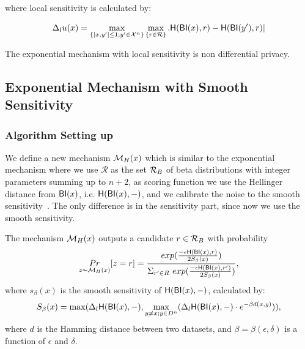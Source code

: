 where local sensitivity is calculated by:

\begin{equation*}
\Delta_{l}u(x) = 
\max_{\{|x,y'| \leq 1;y'\in \mathcal{X}^n\}}\max_{\{r\in \mathcal{R}\}}.
\mathsf{H}(\mathsf{BI}(x), r) - \mathsf{H}(\mathsf{BI}(y'), r)|
\end{equation*}

The exponential mechanism with local sensitivity is non differential privacy\cite{dwork2014algorithmic}.


\subsection{Exponential Mechanism with Smooth Sensitivity}
\label{sec_smoo}

\subsubsection{Algorithm Setting up}
We define a new mechanism $\mathcal{M}_H(x)$
which is similar to the exponential mechanism where we use
$\mathcal{R}$ as the set $\mathcal{R}_{B}$ of beta distributions with integer parameters
summing up to $n+2$, as scoring function we use the Hellinger distance
from $\mathsf{BI}(x)$, i.e. $\mathsf{H}(\mathsf{BI}(x),-)$, and we 
calibrate the noise to the smooth sensitivity~\cite{nissim2007smooth}. The
only difference is in the sensitivity part, since now we use the
smooth sensitivity.

\begin{definition} The mechanism $\mathcal{M}_H(x)$ outputs a candidate $r \in \mathcal{R}_{B}$ with probability
\begin{equation*}
\underset{z \thicksim \mathcal{M}_H(x)}{Pr}[z=r] = \frac
{exp(\frac{-\epsilon\mathsf{H}(\mathsf{BI}(x),r)}{2 S_\beta(x)})}
{\Sigma_{r' \in R}\ exp(\frac{-\epsilon \mathsf{H}(\mathsf{BI}(x),r')}{2 S_\beta(x)})},
\end{equation*}
where $s_\beta(x)$ is the smooth sensitivity of $\mathsf{H}(\mathsf{BI}(x),-)$, calculated by:
\begin{equation*}
S_{\beta}(x) = \max(\Delta_{l}\mathsf{H}(\mathsf{BI}(x),-), \max_{y \neq x; y \in D^{n}}(\Delta_{l}\mathsf{H}(\mathsf{BI}(x),-)\cdot e^{-\beta d(x,y)})),
\end{equation*}
where $d$ is the Hamming distance between two datasets, and $\beta =
\beta(\epsilon, \delta)$ is a function of $\epsilon$ and $\delta$. 
\end{definition}


